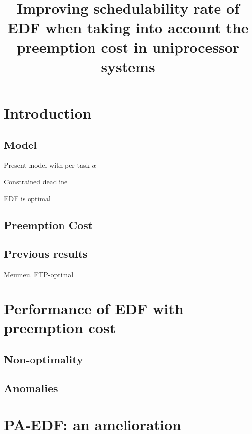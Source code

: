 \documentclass[a4paper,10pt]{article}
\title{Improving schedulability rate of EDF when taking into account the preemption cost in uniprocessor systems}
\begin{document}
\maketitle

\tableofcontents

\newpage

\begin{abstract}



\end{abstract}

\newpage

\section{Introduction}

    \subsection{Model}

    Present model with per-task $\alpha$

    Constrained deadline

    EDF is optimal

    \subsection{Preemption Cost}

    \subsection{Previous results}

    Meumeu, FTP-optimal

\section{Performance of EDF with preemption cost}

    \subsection{Non-optimality}

    \subsection{Anomalies}

\section{PA-EDF: an amelioration}

\nocite{*}


\end{document}
